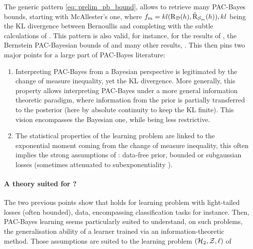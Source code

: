 The generic pattern \eqref{eq: prelim_pb_bound}, allows to retrieve many PAC-Bayes bounds, starting with McAllester's one, where $f_m= kl(\text{R}_{\mathcal{D}}(h),\hat{\text{R}}_{\mathcal{S}_m}(h)), kl$ being the KL divergence between Bernoullis and completing with the subtle calculations of \citet{maurer2004note}. This pattern is also valid, for instance, for the results of \citet{germain2009pac}, the Bernstein PAC-Bayesian bounds of \citet{tolstikhin2013pac,mhammedi2019pac} and many other results, \eg \citet{thiemann2017strongly,guedj2018pac,holland2019pac,wu2022split}. This then pins two major points for a large part of PAC-Bayes literature: 

\begin{enumerate}
  \item Interpreting PAC-Bayes from a Bayesian perspective is legitimated by the change of measure inequality, yet the KL divergence. More generally, this property allows interpreting PAC-Bayes under a more general information theoretic paradigm, where information from the prior is partially transferred to the posterior (here by absolute continuity to keep the KL finite). This vision encompasses the Bayesian one, while being less restrictive.
  \item The statistical properties of the learning problem are linked to the exponential moment coming from the change of measure inequality, this often implies the strong assumptions of : data-free prior, bounded or subgaussian losses (sometimes attenuated to subexponentiality \citealp{catoni2004statistical}).
\end{enumerate}

\paragraph{A theory suited for ?}
The two previous points show that  holds for learning problem with light-tailed losses (often bounded), \iid data, encompassing classification tasks for instance. Then, PAC-Bayes learning seems particularly suited to understand, on such problems, the generalisation ability of a learner trained via an information-theoretic method. 
Those assumptions are suited to the learning problem $(\mathcal{H}_2,\mathcal{Z},\ell)$ of  


